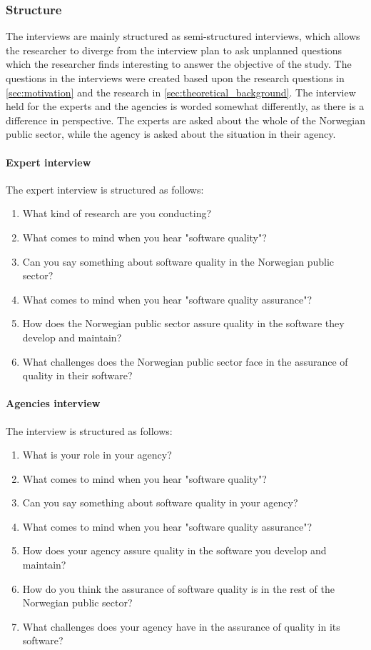 \subsubsection{Structure}
The interviews are mainly structured as semi-structured interviews, which allows the researcher to diverge from the interview plan to ask unplanned questions which the researcher finds interesting to answer the objective of the study. The questions in the interviews were created based upon the research questions in \autoref{sec:motivation} and the research in \autoref{sec:theoretical_background}. The interview held for the experts and the agencies is worded somewhat differently, as there is a difference in perspective. The experts are asked about the whole of the Norwegian public sector, while the agency is asked about the situation in their agency.

\paragraph{Expert interview}
The expert interview is structured as follows:

\begin{enumerate}
    \item What kind of research are you conducting?
    \item What comes to mind when you hear "software quality"?
    \item Can you say something about software quality in the Norwegian public sector?
    \item What comes to mind when you hear "software quality assurance"?
    \item How does the Norwegian public sector assure quality in the software they develop and maintain?
    \item What challenges does the Norwegian public sector face in the assurance of quality in their software?
\end{enumerate}

\paragraph{Agencies interview}
The interview is structured as follows:

\begin{enumerate}
    \item What is your role in your agency?
    \item What comes to mind when you hear "software quality"?
    \item Can you say something about software quality in your agency?
    \item What comes to mind when you hear "software quality assurance"?
    \item How does your agency assure quality in the software you develop and maintain?
    \item How do you think the assurance of software quality is in the rest of the Norwegian public sector?
    \item What challenges does your agency have in the assurance of quality in its software?
\end{enumerate}

